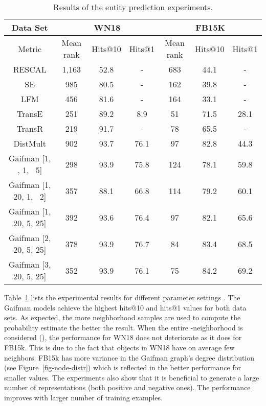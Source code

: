 \documentclass{article}
\begin{document}
\begin{table}
\caption{\label{exp-table} Results of the entity prediction experiments.}
\centering
\small
\begin{tabular}{|c|ccc|ccc|}
\hline 
Data Set & \multicolumn{3}{c|}{WN18} & \multicolumn{3}{c|}{FB15K} \\ 
\hline 
Metric & Mean rank & Hits@10 & Hits@1 & Mean rank & Hits@10 & Hits@1\\ 
\hline
RESCAL\cite{nickel:2011} & 1,163 & 52.8 & - & 683 & 44.1 & - \\ 
SE\cite{Bordes:2011}  & 985 & 80.5 & - & 162 & 39.8 & - \\ 
LFM\cite{jenatton:2012}  & 456 &  81.6 & - & 164 & 33.1 & - \\ 
TransE\cite{Bordes:2013}  & 251  & 89.2 &  8.9 & 51  &  71.5 & 28.1 \\ 
TransR\cite{lin:2015}  & 219  & 91.7 & - & 78 &  65.5 & - \\ 
DistMult\cite{Yang:2015} & 902 &  93.7 & 76.1 & 97 & 82.8 & 44.3 \\
\hline
\hline
Gaifman [1, , 1, \ 5]  & 298  & 93.9 & 75.8 & 124 &  78.1 & 59.8 \\
Gaifman [1, 20, 1, \ 2]  & 357 & 88.1 & 66.8 & 114 & 79.2 & 60.1 \\
\hline
Gaifman [1, 20, 5, 25]  & 392 & 93.6 & 76.4 & 97 & 82.1 & 65.6 \\
Gaifman [2, 20, 5, 25]  & 378 &  93.9 & 76.7 & 84 & 83.4 & 68.5 \\
Gaifman [3, 20, 5, 25]  & 352 &  93.9 &  76.1 & 75 & 84.2 & 69.2 \\
\hline
\end{tabular}
\end{table}
\normalsize

Table~\ref{exp-table} lists the experimental results for different parameter settings . The Gaifman models achieve the highest hits@10 and hits@1 values for both data sets. As expected, the more neighborhood samples are used to compute the probability estimate  the better the result. When the entire -neighborhood is considered (), the performance for WN18 does not deteriorate as it does for FB15k. This is due to the fact that objects in WN18 have on average few neighbors. FB15k has more variance in the Gaifman graph's degree distribution (see Figure~\ref{fig-node-distr}) which is reflected in the better performance for smaller  values. The experiments also show that it is beneficial to generate a large number of representations (both positive and negative ones). The performance improves with larger number of training examples.
\end{document}
